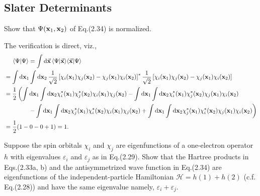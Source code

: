 \documentclass[a4paper]{book}
\newcounter{exercise}[chapter]
\newcounter{solution}[chapter]
\newcommand*{\dif}{\mathop{}\!\mathrm{d}}
\newcommand{\bfx}{{\bf x}}
\begin{document}
	\subsection{Slater Determinants}
	
	\begin{exercise}
	Show that $\Psi({\bf x}_1,{\bf x}_2)$ of Eq.(2.34) is normalized.
	\end{exercise}
	
	\begin{solution}
	The verification is direct, viz.,
	\begin{align*}
		&\hspace{1.4em}\langle \Psi | \Psi \rangle = \int \dif \vec{\bfx} \, \langle \Psi | \vec{\bfx} \rangle \langle \vec{\bfx} | \Psi \rangle \\
		&= \int \dif \bfx_1 \int \dif \bfx_2 \, \frac{1}{\sqrt{2}} \left[ \chi_i(\bfx_1) \chi_j(\bfx_2) - \chi_j(\bfx_1) \chi_i(\bfx_2) \right]^* \frac{1}{\sqrt{2}} \left[ \chi_i(\bfx_1) \chi_j(\bfx_2) - \chi_j(\bfx_1) \chi_i(\bfx_2) \right] \\
		&= \frac{1}{2} \left( \int \dif \bfx_1 \int \dif \bfx_2 \chi^*_i(\bfx_1) \chi^*_j(\bfx_2) \chi_i(\bfx_1) \chi_j(\bfx_2) - \int \dif \bfx_1 \int \dif \bfx_2 \chi^*_i(\bfx_1) \chi^*_j(\bfx_2) \chi_j(\bfx_1) \chi_i(\bfx_2) \right. \\
		&\hspace{4em} \left. - \int \dif \bfx_1 \int \dif \bfx_2  \chi_j^*(\bfx_1) \chi_i^*(\bfx_2) \chi_i(\bfx_1) \chi_j(\bfx_2) + \int \dif \bfx_1 \int \dif \bfx_2 \chi_j^*(\bfx_1) \chi_i^*(\bfx_2) \chi_j(\bfx_1) \chi_i(\bfx_2) \right) \\
		&= \frac{1}{2} ( 1 - 0 - 0 + 1 ) = 1.
	\end{align*}
	
	\end{solution}
	
	\begin{exercise}
	Suppose the spin orbitals $\chi_i$ and $\chi_j$ are eigenfunctions of a one-electron operator $h$ with eigenvalues $\varepsilon_i$ and $\varepsilon_j$ as in Eq.(2.29). Show that the Hartree products in Eqs.(2.33a, b) and the antisymmetrized wave function in Eq.(2.34) are eigenfunctions of the independent-particle Hamiltonian $\mathscr{H} = h(1) + h(2)$ (c.f. Eq.(2.28)) and have the same eigenvalue namely, $\varepsilon_i + \varepsilon_j$. 
	\end{exercise}
	
\end{document}
